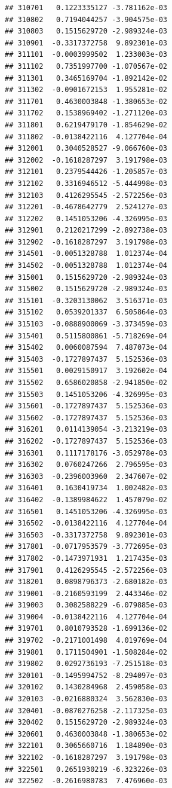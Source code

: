 \begin{frame}[fragile]
\begin{verbatim}
## 310701   0.1223335127 -3.781162e-03
## 310802   0.7194044257 -3.904575e-03
## 310803   0.1515629720 -2.989324e-03
## 310901  -0.3317372758  9.892301e-03
## 311101  -0.0003999502  1.233003e-03
## 311102   0.7351997700 -1.070567e-02
## 311301   0.3465169704 -1.892142e-02
## 311302  -0.0901672153  1.955281e-02
## 311701   0.4630003848 -1.380653e-02
## 311702   0.1538969402 -1.271120e-03
## 311801   0.6219479170 -1.854629e-02
## 311802  -0.0138422116  4.127704e-04
## 312001   0.3040528527 -9.066760e-03
## 312002  -0.1618287297  3.191798e-03
## 312101   0.2379544426 -1.205857e-03
## 312102   0.3316946512 -5.444998e-03
## 312103   0.4126295545 -2.572256e-03
## 312201  -0.4678642779  2.524127e-03
## 312202   0.1451053206 -4.326995e-03
## 312901   0.2120217299 -2.892738e-03
## 312902  -0.1618287297  3.191798e-03
## 314501  -0.0051328788  1.012374e-04
## 314502  -0.0051328788  1.012374e-04
## 315001   0.1515629720 -2.989324e-03
## 315002   0.1515629720 -2.989324e-03
## 315101  -0.3203130062  3.516371e-03
## 315102   0.0539201337  6.505864e-03
## 315103  -0.0888900069 -3.373459e-03
## 315401   0.5115800861 -5.718269e-04
## 315402   0.0060087594  7.487073e-04
## 315403  -0.1727897437  5.152536e-03
## 315501   0.0029150917  3.192602e-04
## 315502   0.6586020858 -2.941850e-02
## 315503   0.1451053206 -4.326995e-03
## 315601  -0.1727897437  5.152536e-03
## 315602  -0.1727897437  5.152536e-03
## 316201   0.0114139054 -3.213219e-03
## 316202  -0.1727897437  5.152536e-03
## 316301   0.1117178176 -3.052978e-03
## 316302   0.0760247266  2.796595e-03
## 316303  -0.2396003960  2.347607e-02
## 316401   0.1630419734  1.002482e-03
## 316402  -0.1389984622  1.457079e-02
## 316501   0.1451053206 -4.326995e-03
## 316502  -0.0138422116  4.127704e-04
## 316503  -0.3317372758  9.892301e-03
## 317801  -0.0717953579 -3.772695e-03
## 317802  -0.1473971931  1.217435e-03
## 317901   0.4126295545 -2.572256e-03
## 318201   0.0898796373 -2.680182e-03
## 319001  -0.2160593199  2.443346e-02
## 319003   0.3082588229 -6.079885e-03
## 319004  -0.0138422116  4.127704e-04
## 319701   0.8010793528 -1.699136e-02
## 319702  -0.2171001498  4.019769e-04
## 319801   0.1711504901 -1.508284e-02
## 319802   0.0292736193 -7.251518e-03
## 320101  -0.1495994752 -8.294097e-03
## 320102   0.1430284968  2.459058e-03
## 320103  -0.0216880324  3.562830e-03
## 320401  -0.0870276258 -2.117325e-03
## 320402   0.1515629720 -2.989324e-03
## 320601   0.4630003848 -1.380653e-02
## 322101   0.3065660716  1.184890e-03
## 322102  -0.1618287297  3.191798e-03
## 322501   0.2651930219 -6.323226e-03
## 322502  -0.2616980783  7.476960e-03

\end{verbatim}
\end{frame}
